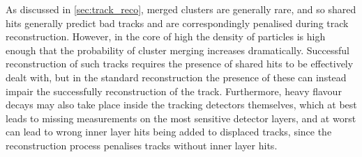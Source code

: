 As discussed in \cref{sec:track_reco}, merged clusters are generally rare, and so shared hits generally predict bad tracks and are correspondingly penalised during track reconstruction.
However, in the core of high \pT \bjets the density of particles is high enough that the probability of cluster merging increases dramatically.
Successful reconstruction of such tracks requires the presence of shared hits to be effectively dealt with, but in the standard reconstruction the presence of these can instead impair the successfully reconstruction of the track.
Furthermore, heavy flavour decays may also take place inside the tracking detectors themselves, which at best leads to missing measurements on the most sensitive detector layers, and at worst can lead to wrong inner layer hits being added to displaced tracks, since the reconstruction process penalises tracks without inner layer hits.

